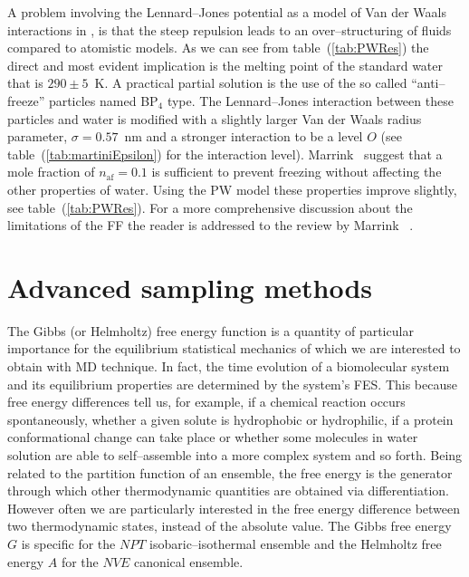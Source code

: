 A problem involving the Lennard--Jones potential as a model of Van der Waals interactions in \martini, is that 
the steep repulsion leads to an over--structuring of fluids compared to atomistic models. As we can see from 
table~(\ref{tab:PWRes}) the direct and most evident implication is the melting point of the standard \martini 
water that is $290 \pm 5$~K. A practical partial solution is the use of the so called ``anti--freeze'' particles 
named BP$_4$ type. The Lennard--Jones interaction between these particles and water is modified with a slightly 
larger Van der Waals radius parameter, $\sigma = 0.57$~nm and a stronger interaction to be a level $O$ (see 
table~(\ref{tab:martiniEpsilon}) for the interaction level). Marrink \etal\, suggest that a mole fraction of 
$n_{\text{af}} = 0.1$ is sufficient to prevent freezing without affecting the other properties of water. 
Using the \ac{PW} model these properties improve slightly, see table~(\ref{tab:PWRes}). For a more comprehensive 
discussion about the limitations of the \martini \ac{FF} the reader is addressed to the review by Marrink \etal\, \cite{MartiniReview}.

\section{Advanced sampling methods}
The Gibbs (or Helmholtz) free energy function is a quantity of particular importance for the equilibrium 
statistical mechanics of which we are interested to obtain with \ac{MD} technique. In fact, the time evolution of 
a biomolecular system and its equilibrium properties are determined by the system's \ac{FES}. This because free 
energy differences tell us, for example, if a chemical reaction occurs spontaneously, whether a given solute is 
hydrophobic or hydrophilic, if a protein conformational change can take place or whether some molecules in water 
solution are able to self--assemble into a more complex system and so forth. Being related to the partition 
function of an ensemble, the free energy is the generator through which other thermodynamic quantities are 
obtained via differentiation. However often we are particularly interested in the free energy difference between 
two thermodynamic states, instead of the absolute value. The Gibbs free energy $G$ is specific for the $NPT$ 
isobaric--isothermal ensemble and the Helmholtz free energy $A$ for the $NVE$ canonical ensemble. 

